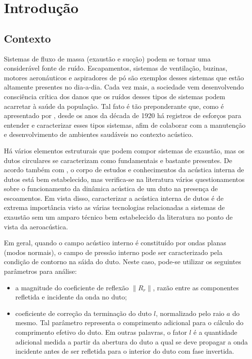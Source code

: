 \chapter{Introdução}
\label{chapter:introdcao}

\section{Contexto}

Sistemas de fluxo de massa (exaustão e sucção) podem se tornar uma considerável fonte de ruído. Escapamentos, sistemas de ventilação, buzinas, motores aeronáuticos e aspiradores de pó são exemplos desses sistemas que estão altamente presentes no dia-a-dia. Cada vez mais, a sociedade vem desenvolvendo consciência crítica dos danos que os ruídos desses tipos de sistemas podem acarretar à saúde da população. Tal fato é tão preponderante que, como é apresentado por , desde os anos da década de 1920 há registros de esforços para entender e caracterizar esses tipos sistemas, afim de colaborar com a manutenção e desenvolvimento de ambientes saudáveis no contexto acústico.

Há vários elementos estruturais que podem compor sistemas de exaustão, mas os dutos circulares se caracterizam como fundamentais e bastante presentes. De acordo também com , o corpo de estudos e conhecimentos da acústica interna de dutos está bem estabelecido, mas verifica-se na literatura vários questionamentos sobre o funcionamento da dinâmica acústica de um duto na presença de escoamentos. Em vista disso, caracterizar a acústica interna de dutos é de extrema importância visto as várias tecnologias relacionadas a sistemas de exaustão sem um amparo técnico bem estabelecido da literatura no ponto de vista da aeroacústica.

Em geral, quando o campo acústico interno é constituído por ondas planas (modos normais), o campo de pressão interno pode ser caracterizado pela condição de contorno na sáida do duto. Neste caso, pode-se utilizar os seguintes parâmetros para análise:

\begin{itemize}
    \item a magnitude do coeficiente de reflexão $\|R_{r}\|$, razão entre as componentes refletida e incidente da onda no duto;
    

    \item coeficiente de correção da terminação do duto $l$, normalizado pelo raio $a$ do mesmo. Tal parâmetro representa o comprimento adicional para o cálculo do comprimento efetivo do duto. Em outras palavras, o fator $l$ é a quantidade adicional medida a partir da abertura do duto a qual se deve propagar a onda incidente antes de ser refletida para o interior do duto com fase invertida.
\end{itemize}

